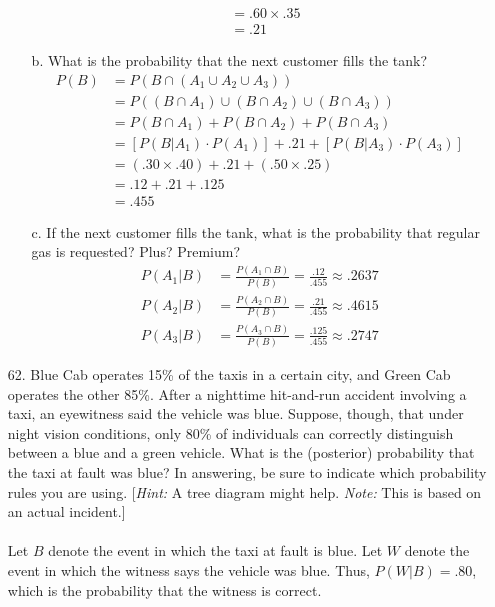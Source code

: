 \documentclass[letterpaper,12pt]{article}
\begin{document}
\begin{enumerate}
\begin{enumerate}
\begin{align*}
          &= .60 \times .35 \\
          &= .21
        \end{align*}
      \item[b.]
        What is the probability that the next customer fills the tank?
        \begin{align*}
          P(B) &= P(B \cap (A_1 \cup A_2 \cup A_3)) \\
          &= P((B \cap A_1) \cup (B \cap A_2) \cup (B \cap A_3)) \\
          &= P(B \cap A_1) + P(B \cap A_2) + P(B \cap A_3) \\
          &= [P(B|A_1) \cdot P(A_1)] + .21 + [P(B|A_3) \cdot P(A_3)] \\
          &= (.30 \times .40) + .21 + (.50 \times .25) \\
          &= .12 + .21 + .125 \\
          & = .455
        \end{align*}
      \item[c.]
        If the next customer fills the tank, what is the probability that regular gas is requested? Plus? Premium?
        \begin{align*}
          P(A_1|B) &= \frac{P(A_1 \cap B)}{P(B)} = \frac{.12}{.455} \approx .2637 \\
          P(A_2|B) &= \frac{P(A_2 \cap B)}{P(B)} = \frac{.21}{.455} \approx .4615 \\
          P(A_3|B) &= \frac{P(A_3 \cap B)}{P(B)} = \frac{.125}{.455} \approx .2747
        \end{align*}
    \end{enumerate}
  \item[62.]
    Blue Cab operates 15\% of the taxis in a certain city, and Green Cab operates the other 85\%. After a nighttime hit-and-run accident involving a taxi, an eyewitness said the vehicle was blue. Suppose, though, that under night vision conditions, only 80\% of individuals can correctly distinguish between a blue and a green vehicle. What is the (posterior) probability that the taxi at fault was blue? In answering, be sure to indicate which probability rules you are using. [\textit{Hint:} A tree diagram might help. \textit{Note:} This is based on an actual incident.]
    \\ \\
    Let $B$ denote the event in which the taxi at fault is blue. Let $W$ denote the event in which the witness says the vehicle was blue. Thus, $P(W|B) = .80$, which is the probability that the witness is correct.

\end{enumerate}
\end{document}
